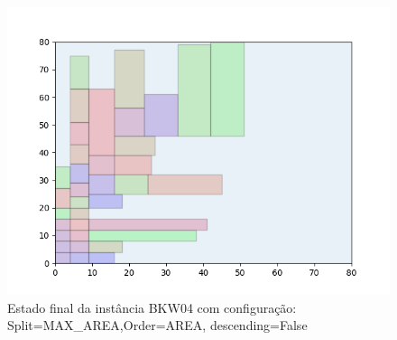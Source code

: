 \begin{figure}[H]
    \centering
    \caption[]{Estado final da instância BKW04 com configuração: Split=MAX_AREA,Order=AREA, descending=False}
    \label{fig:bkw04-max_area-area-false}
    \includegraphics[scale=0.5]{output/figures/bkw/bkw04/max_area/area/false/00}
\end{figure}